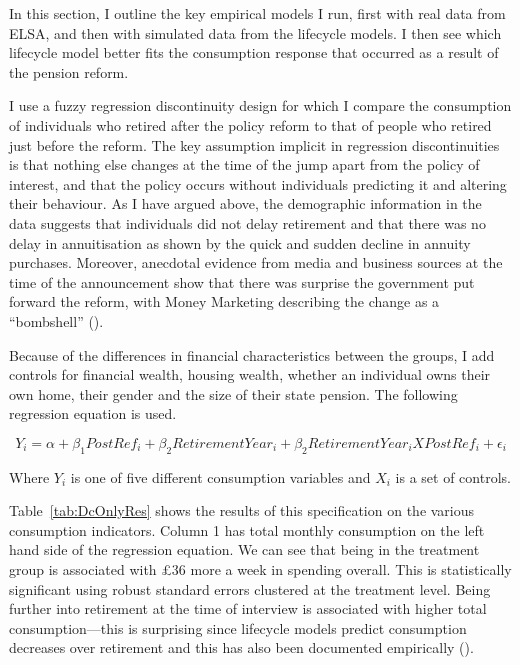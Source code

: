 \documentclass[12pt]{article}
\begin{document}
In this section, I outline the key empirical models I run, first with real
data from ELSA, and then with simulated data from the lifecycle models. I then
see which lifecycle model better fits the consumption response that occurred as
a result of the pension reform.

I use a fuzzy regression discontinuity design for which I compare the
consumption of individuals who retired after the policy reform to that of people
who retired just before the reform. The key assumption implicit in regression
discontinuities is that nothing else changes at the time of the jump apart from
the policy of interest, and that the policy occurs without individuals
predicting it and altering their behaviour. As I have argued above, the
demographic information in the data suggests that individuals did not delay
retirement and that there was no delay in annuitisation as shown by the quick
and sudden decline in annuity purchases. Moreover, anecdotal evidence from media
and business sources at the time of the announcement show that there was
surprise the government put forward the reform, with Money Marketing describing
the change as a ``bombshell'' (\cite{money-marketing-announcement}).

Because of the differences in financial characteristics between the groups, I
add controls for financial wealth, housing wealth, whether an individual owns
their own home, their gender and the size of their state pension. The following
regression equation is used.

\begin{equation*}
  \label{eq:main-rd}
  Y_{i} = \alpha + \beta_{1} PostRef_{i} + \beta_{2} RetirementYear_{i}  + \beta_{2} RetirementYear_{i} X PostRef_{i}  + \epsilon_{i}
\end{equation*}

Where $Y_{i}$ is one of five different consumption variables and $X_{i}$ is
a set of controls.

Table~\ref{tab:DcOnlyRes} shows the results of this specification on the various
consumption indicators. Column 1 has total monthly consumption on the left hand
side of the regression equation. We can see that being in the treatment group is
associated with £36 more a week in spending overall. This is statistically
significant using robust standard errors clustered at the treatment level. Being
further into retirement at the time of interview is associated with higher total
consumption---this is surprising since lifecycle models predict consumption
decreases over retirement and this has also been documented empirically
(\cite{hurd-rohwedder-nber-2003}).
\end{document}
